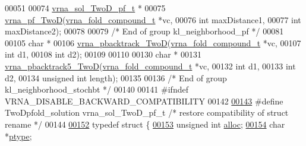 \begin{DoxyCode}
00051 
00074 \mbox{\hyperlink{group__kl__neighborhood__pf_structvrna__sol___two_d__pf__t}{vrna\_sol\_TwoD\_pf\_t}} *
00075 \mbox{\hyperlink{group__kl__neighborhood__pf_ga0bc3427689bd09da09b8b3094a27f836}{vrna\_pf\_TwoD}}(\mbox{\hyperlink{group__fold__compound_structvrna__fc__s}{vrna\_fold\_compound\_t}} *vc,
00076              \textcolor{keywordtype}{int}                  maxDistance1,
00077              \textcolor{keywordtype}{int}                  maxDistance2);
00078 
00079  \textcolor{comment}{/* End of group kl\_neighborhood\_pf */}
00081 
00105 \textcolor{keywordtype}{char} *
00106 \mbox{\hyperlink{group__kl__neighborhood__stochbt_ga14aceef73f83bbde77bb3a0ca06c9d13}{vrna\_pbacktrack\_TwoD}}(\mbox{\hyperlink{group__fold__compound_structvrna__fc__s}{vrna\_fold\_compound\_t}} *vc,
00107                      \textcolor{keywordtype}{int}                  d1,
00108                      \textcolor{keywordtype}{int}                  d2);
00109 
00110 
00130 \textcolor{keywordtype}{char} *
00131 \mbox{\hyperlink{group__kl__neighborhood__stochbt_ga6504913303bc325659c365d5f59b41e0}{vrna\_pbacktrack5\_TwoD}}(\mbox{\hyperlink{group__fold__compound_structvrna__fc__s}{vrna\_fold\_compound\_t}}  *vc,
00132                       \textcolor{keywordtype}{int}                   d1,
00133                       \textcolor{keywordtype}{int}                   d2,
00134                       \textcolor{keywordtype}{unsigned} \textcolor{keywordtype}{int}          length);
00135 
00136  \textcolor{comment}{/* End of group kl\_neighborhood\_stochbt */}
00140 
00141 \textcolor{preprocessor}{#ifndef VRNA\_DISABLE\_BACKWARD\_COMPATIBILITY}
00142 
\mbox{\hyperlink{2_dpfold_8h_ab8a8411ac20b57a2f569edd6da7fcbc2}{00143}} \textcolor{preprocessor}{#define TwoDpfold\_solution       vrna\_sol\_TwoD\_pf\_t         }\textcolor{comment}{/* restore compatibility of struct rename */}\textcolor{preprocessor}{}
00144 
\mbox{\hyperlink{struct_two_dpfold__vars}{00152}} \textcolor{keyword}{typedef} \textcolor{keyword}{struct }\{
\mbox{\hyperlink{struct_two_dpfold__vars_a0821fddd5fe7892cd86933b506d2822e}{00153}}   \textcolor{keywordtype}{unsigned} \textcolor{keywordtype}{int}          \mbox{\hyperlink{struct_two_dpfold__vars_a0821fddd5fe7892cd86933b506d2822e}{alloc}};
\mbox{\hyperlink{struct_two_dpfold__vars_a67f37b8901b8d0a049c216d4c6241b07}{00154}}   \textcolor{keywordtype}{char}                  *\mbox{\hyperlink{struct_two_dpfold__vars_a67f37b8901b8d0a049c216d4c6241b07}{ptype}};       

\end{DoxyCode}
